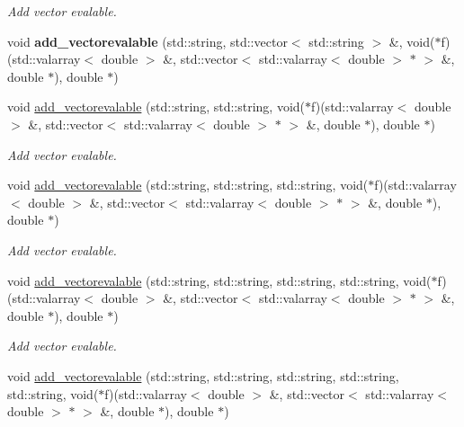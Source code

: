 \begin{CompactItemize}
\begin{CompactList}\small\item\em Add vector evalable. \item\end{CompactList}\item 
\hypertarget{classmeasurements_64fe02427d35684b443953aa0de114f5}{
void \textbf{add\_\-vectorevalable} (std::string, std::vector$<$ std::string $>$ \&, void($\ast$f)(std::valarray$<$ double $>$ \&, std::vector$<$ std::valarray$<$ double $>$ $\ast$ $>$ \&, double $\ast$), double $\ast$)}
\label{classmeasurements_64fe02427d35684b443953aa0de114f5}

\item 
\hypertarget{classmeasurements_8c749f717514315b5fac0f515567e6bf}{
void \hyperlink{classmeasurements_8c749f717514315b5fac0f515567e6bf}{add\_\-vectorevalable} (std::string, std::string, void($\ast$f)(std::valarray$<$ double $>$ \&, std::vector$<$ std::valarray$<$ double $>$ $\ast$ $>$ \&, double $\ast$), double $\ast$)}
\label{classmeasurements_8c749f717514315b5fac0f515567e6bf}

\begin{CompactList}\small\item\em Add vector evalable. \item\end{CompactList}\item 
\hypertarget{classmeasurements_66f6bf4ac799bfbb4cc0446c833da341}{
void \hyperlink{classmeasurements_66f6bf4ac799bfbb4cc0446c833da341}{add\_\-vectorevalable} (std::string, std::string, std::string, void($\ast$f)(std::valarray$<$ double $>$ \&, std::vector$<$ std::valarray$<$ double $>$ $\ast$ $>$ \&, double $\ast$), double $\ast$)}
\label{classmeasurements_66f6bf4ac799bfbb4cc0446c833da341}

\begin{CompactList}\small\item\em Add vector evalable. \item\end{CompactList}\item 
\hypertarget{classmeasurements_5e719fe8cdf52e556b430b6b48121143}{
void \hyperlink{classmeasurements_5e719fe8cdf52e556b430b6b48121143}{add\_\-vectorevalable} (std::string, std::string, std::string, std::string, void($\ast$f)(std::valarray$<$ double $>$ \&, std::vector$<$ std::valarray$<$ double $>$ $\ast$ $>$ \&, double $\ast$), double $\ast$)}
\label{classmeasurements_5e719fe8cdf52e556b430b6b48121143}

\begin{CompactList}\small\item\em Add vector evalable. \item\end{CompactList}\item 
\hypertarget{classmeasurements_146ab52800efecf18892a6cc54ddd5d3}{
void \hyperlink{classmeasurements_146ab52800efecf18892a6cc54ddd5d3}{add\_\-vectorevalable} (std::string, std::string, std::string, std::string, std::string, void($\ast$f)(std::valarray$<$ double $>$ \&, std::vector$<$ std::valarray$<$ double $>$ $\ast$ $>$ \&, double $\ast$), double $\ast$)}
\label{classmeasurements_146ab52800efecf18892a6cc54ddd5d3}


\end{CompactItemize}
